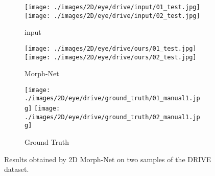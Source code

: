 \documentclass[12pt]{article}
\begin{document}
\begin{table}
    \centering
    \caption{Accuracy and AUC achieved on the test set by different networks for the DRIVE and STARE datasets.}
    \label{cifar10_table}
    \label{quant_eye}
\end{table}


\begin{figure}
    \centering
    \begin{subfigure}[t]{0.325\linewidth}
        \texttt{[image: ./images/2D/eye/drive/input/01\_test.jpg]}
        \texttt{[image: ./images/2D/eye/drive/input/02\_test.jpg]}
        \caption{input}
    \end{subfigure}
    \begin{subfigure}[t]{0.325\linewidth}
    \texttt{[image: ./images/2D/eye/drive/ours/01\_test.jpg]}       
    \texttt{[image: ./images/2D/eye/drive/ours/02\_test.jpg]}
    \caption{Morph-Net}
    \end{subfigure}
    \begin{subfigure}[t]{0.325\linewidth}
        \texttt{[image: ./images/2D/eye/drive/ground\_truth/01\_manual1.jpg]}
        \texttt{[image: ./images/2D/eye/drive/ground\_truth/02\_manual1.jpg]}
        \caption{Ground Truth}
    \end{subfigure}
\caption{Results obtained by 2D Morph-Net on two samples of the DRIVE dataset.}
\label{qualdrive}
\end{figure}
\end{document}
